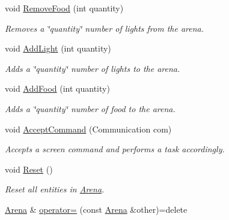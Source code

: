 \begin{DoxyCompactItemize}
\mbox{\label{class_arena_afe8183aefcc378cff0d4eda15dd49cb9}} 
void \mbox{\hyperlink{class_arena_afe8183aefcc378cff0d4eda15dd49cb9}{Remove\+Food}} (int quantity)
\begin{DoxyCompactList}\small\item\em Removes a \char`\"{}quantity\char`\"{} number of lights from the arena. \end{DoxyCompactList}\item 
\mbox{\label{class_arena_a6c32af2d77a9afde2a41aa7359a62763}} 
void \mbox{\hyperlink{class_arena_a6c32af2d77a9afde2a41aa7359a62763}{Add\+Light}} (int quantity)
\begin{DoxyCompactList}\small\item\em Adds a \char`\"{}quantity\char`\"{} number of lights to the arena. \end{DoxyCompactList}\item 
\mbox{\label{class_arena_a663b46b86ee69523e993ec38d079c482}} 
void \mbox{\hyperlink{class_arena_a663b46b86ee69523e993ec38d079c482}{Add\+Food}} (int quantity)
\begin{DoxyCompactList}\small\item\em Adds a \char`\"{}quantity\char`\"{} number of food to the arena. \end{DoxyCompactList}\item 
void \mbox{\hyperlink{class_arena_a16fac8e4b2399fcf0db01a9722069c33}{Accept\+Command}} (Communication com)
\begin{DoxyCompactList}\small\item\em Accepts a screen command and performs a task accordingly. \end{DoxyCompactList}\item 
\mbox{\label{class_arena_a95e295d03a14385f4402a8e839fbae9b}} 
void \mbox{\hyperlink{class_arena_a95e295d03a14385f4402a8e839fbae9b}{Reset}} ()
\begin{DoxyCompactList}\small\item\em Reset all entities in \mbox{\hyperlink{class_arena}{Arena}}. \end{DoxyCompactList}\item 
\mbox{\label{class_arena_aa977a50aa4a5570a2a553705f1909e9b}} 
\mbox{\hyperlink{class_arena}{Arena}} \& \mbox{\hyperlink{class_arena_aa977a50aa4a5570a2a553705f1909e9b}{operator=}} (const \mbox{\hyperlink{class_arena}{Arena}} \&other)=delete

\end{DoxyCompactItemize}

